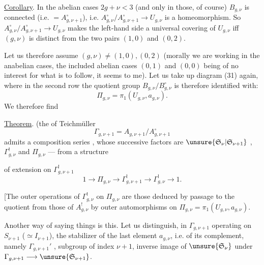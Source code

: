 \uline{Corollary}. In the abelian cases $2g+\nu<3$ (and only in those, of course) $B_{g,\nu}$ is connected (i.e. $=A_{g,\nu+1}^{\circ}$), i.e. $A_{g,\nu}^{\circ}/A_{g,\nu+1}^{\circ}\longrightarrow U_{g,\nu}$ is a homeomorphism. So $A_{g,\nu}^{\circ}/A_{g,\nu+1}^{\circ}\longrightarrow U_{g,\nu}$ makes the left-hand side a universal covering of $U_{g,\nu}$ iff $(g,\nu)$ is distinct from the two pairs $(1,0)$ and $(0,2)$.

Let us therefore assume $(g,\nu)\ne(1,0),(0,2)$ (morally we are working in the anabelian cases, the  included abelian cases $(0,1)$ and $(0,0)$ being  of no interest for what is to follow, it seems to me). Let us take up diagram (31) again, where in the second row the quotient group $B_{g,\nu}/B_{g,\nu}^{\circ}$ is therefore identified with:
\[
\Pi_{g,\nu}=\pi_1(U_{g,\nu},a_{g,\nu}).
\]
We therefore find

\uline{Theorem}.  (the   of Teichmüller
\[
\Gamma_{g,\nu+1}=A_{g,\nu+1}/A_{g,\nu+1}^{\circ}
\]
admits a composition series , whose successive factors are $\unsure{\mathfrak S_\nu|\mathfrak S_{\nu+1}}$ , $\Gamma_{g,\nu}^{!}$ and $\Pi_{g,\nu}$ ---  from a structure

of extension on $\Gamma_{g,\nu+1}^{!}$
\[
\tag{41}
1\longrightarrow\Pi_{g,\nu}\longrightarrow\Gamma_{g,\nu+1}^{!}
\longrightarrow\Gamma_{g,\nu}^{!}\longrightarrow1.
\]

[The outer operations of $\Gamma_{g,\nu}^{!}$ on $\Pi_{g,\nu}$ are those deduced by passage to the quotient from those of $A_{g,\nu}^{!}$   by outer automorphisms on $\Pi_{g,\nu}=\pi_1(U_{g,\nu},a_{g,\nu})$.

Another way of saying things is this. Let us distinguish, in $\Gamma_{g,\nu+1}$ operating on $S_{\nu+1}$  ($\simeq I_{\nu+1}$), the stabilizer of the last element $a_{g,\nu}$, i.e. of its complement, namely $\Gamma_{g,\nu+1}'$ ,  subgroup of index $\nu+1$, inverse image of $\unsure{\mathfrak S_\nu}$  under $\Gamma_{g,\nu+1}\longrightarrow\unsure{\mathfrak S_{\nu+1}}$.

